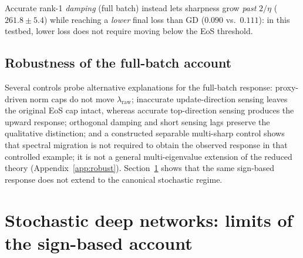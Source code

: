 \documentclass{article}
\theoremstyle{plain}
\theoremstyle{definition}
\theoremstyle{remark}
\newcommand{\lraw}{\ensuremath{\lambda_{\mathrm{raw}}}}
\begin{document}
Accurate rank-1 \emph{damping} (full batch) instead lets sharpness
grow
\emph{past} $2/\eta$ ($261.8\pm5.4$) while reaching a \emph{lower}
final loss than GD ($0.090$ vs.\ $0.111$): in this testbed, lower
loss does not require moving below the EoS threshold.

\subsection{Robustness of the full-batch account}
\label{sub:sam}\label{sub:migration}
Several controls probe alternative explanations for the full-batch
response: proxy-driven norm caps do not move $\lraw$; inaccurate
update-direction sensing leaves the original EoS cap intact, whereas
accurate top-direction sensing produces the upward response;
orthogonal damping and short sensing lags preserve the qualitative
distinction; and a constructed separable multi-sharp control shows
that spectral migration is not required to obtain the observed
response in that controlled example; it is not a general
multi-eigenvalue extension of the reduced theory (Appendix~\ref{app:robust}).
Section~\ref{sec:stochastic} shows that the same sign-based response
does not extend to the canonical stochastic regime.

\section{Stochastic deep networks: limits of the sign-based account}
\label{sec:stochastic}
\end{document}
